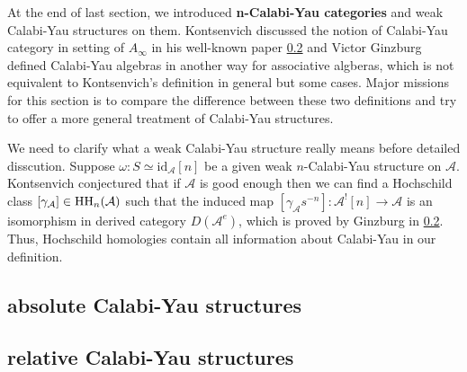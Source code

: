 At the end of last section, we introduced \textbf{n-Calabi-Yau categories} and weak Calabi-Yau structures on them. Kontsenvich discussed the notion of Calabi-Yau category in setting of $A_\infty$ in his well-known paper \ref{} and Victor Ginzburg defined Calabi-Yau algebras in another way for associative algberas, which is not equivalent to Kontsenvich's definition in general but some cases. Major missions for this section is to compare the difference between these two definitions and try to offer a more general treatment of Calabi-Yau structures.
\par
We need to clarify what a weak Calabi-Yau structure really means before detailed disscution. Suppose $\omega: S \simeq \text{id}_{\mathcal{A}}[n]$ be a given weak $n$-Calabi-Yau structure on $\mathcal{A}$. Kontsenvich conjectured that if $\mathcal{A}$ is good enough then we can find a Hochschild class $[\gamma_{\mathcal{A}}] \in \text{HH}_n(\mathcal{A})$ such that the induced map $[\gamma_{\mathcal{A}} s^{-n}]: \mathcal{A}^! [n] \rightarrow \mathcal{A}$ is an isomorphism in derived category $D(\mathcal{A}^{e})$, which is proved by Ginzburg in \ref{}. Thus, Hochschild homologies contain all information about Calabi-Yau in our definition.
\subsection{absolute Calabi-Yau structures}
	
\subsection{relative Calabi-Yau structures}
